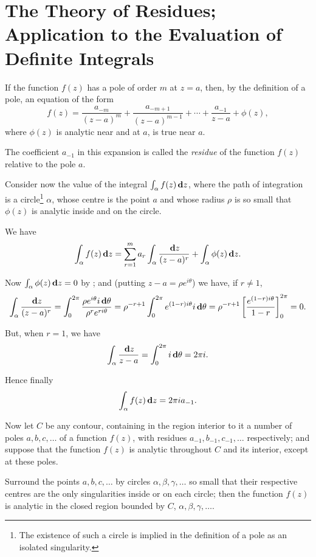 %
%
\chapter{The Theory of Residues; Application to the Evaluation of Definite Integrals}


If the function $f(z)$ has a pole of order $m$ at $z=a$, then, by the
definition of a pole, an equation of the form
$$
f(z)
=
\frac{a_{-m}}{ (z-a)^{m} }
+ \frac{ a_{-m+1} }{ (z-a)^{m-1} }
+ \cdots
+ \frac{a_{-1}}{z-a}
+ \phi(z),
$$
where $\phi(z)$ is analytic near and at $a$, is true near $a$.

The coefficient $a_{-1}$ in this expansion is called the \emph{residue} of the
function $f(z)$ relative to the pole $a$.

Consider now the value of the integral $\int_{\alpha} f(z) \, \mathbf{d} z$, where the path of
integration is a circle\footnote{The existence of such a circle is
  implied in the definition of a pole as an isolated singularity.}
$\alpha$, whose centre is the point $a$ and whose radius $\rho$ is so small
that $\phi(z)$ is analytic inside and on the circle.

We have
$$
\int_{\alpha} f(z) \, \mathbf{d} z
=
\sum_{r=1}^{m}
a_{r}
\int_{\alpha} \frac{\, \mathbf{d} z}{ (z-a)^{r}}
+
\int_{\alpha} \phi(z) \, \mathbf{d} z.
$$

Now $\int_{\alpha} \phi(z) \, \mathbf{d} z = 0$ by ;
and (putting $z-a = \rho e^{i\theta}$) we have, if $r \neq 1$,
$$
\int_{\alpha} \frac{ \, \mathbf{d} z}{ (z-a)^{r} }
=
\int_{0}^{2\pi} \frac{\rho e^{i\theta} i \, \mathbf{d} \theta}{ \rho^{r}
  e^{ri\theta}}
=
\rho^{-r+1}
\int_{0}^{2\pi} e^{(1-r)i\theta} i \, \mathbf{d} \theta
=
\rho^{-r+1}
\left[  \frac{e^{(1-r) i \theta}}{1-r}  \right]_{0}^{2\pi}
=
0.
$$

But, when $r = 1$, we have
$$
\int_{\alpha}
\frac{\, \mathbf{d} z}{z - a}
=
\int_{0}^{2\pi} i \, \mathbf{d} \theta
=
2\pi i.
$$

Hence finally
$$
\int_{\alpha} f(z) \, \mathbf{d} z = 2 \pi i a_{-1}.
$$

Now let $C$ be any contour, containing in the region interior to it a
number of poles $a,b,c,\ldots$ of a function $f(z)$, with residues
$a_{-1}, b_{-1}, c_{-1},\ldots$
respectively; and suppose that the function $f(z)$ is
analytic throughout $C$ and its interior, except at these poles.

Surround the points $a,b,c,\ldots$ by circles
$\alpha,\beta,\gamma,\ldots$
so small that their respective centres are the only singularities
inside or on each circle; then the function $f(z)$ is analytic in the
closed region bounded by $C$, $\alpha,\beta,\gamma,\ldots$.
%
%


